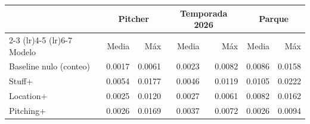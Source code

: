 \begin{tabular}{lrrrrrr}
\toprule
 & \multicolumn{2}{c}{Pitcher} & \multicolumn{2}{c}{Temporada 2026} & \multicolumn{2}{c}{Parque} \\
\cmidrule(lr){2-3} \cmidrule(lr){4-5} \cmidrule(lr){6-7}
Modelo & Media & Máx & Media & Máx & Media & Máx \\
\midrule
Baseline nulo (conteo) & 0.0017 & 0.0061 & 0.0023 & 0.0082 & 0.0086 & 0.0158 \\
Stuff+ & 0.0054 & 0.0177 & 0.0046 & 0.0119 & 0.0105 & 0.0222 \\
Location+ & 0.0025 & 0.0120 & 0.0027 & 0.0061 & 0.0082 & 0.0162 \\
Pitching+ & 0.0026 & 0.0169 & 0.0037 & 0.0072 & 0.0026 & 0.0094 \\
\bottomrule
\end{tabular}

